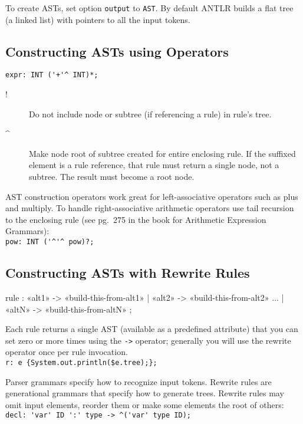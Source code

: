 To create ASTs, set option \verb=output= to \verb=AST=.
By default ANTLR builds a flat tree (a linked list)
with pointers to all the input tokens.


\subsection{Constructing ASTs using Operators}

\verb=expr: INT ('+'^ INT)*;=

\begin{description}
\item[!]
Do not include node or subtree (if referencing a rule) in rule's tree.
\item[\textasciicircum]
Make node root of subtree created for entire enclosing rule.
If the suffixed element is a rule reference,
that rule must return a single node, not a subtree.
The result must become a root node.
\end{description}

AST construction operators work great for left-associative operators
such as plus and multiply.
To handle right-associative arithmetic operators
use tail recursion to the enclosing rule
(see pg.\ 275 in the book for Arithmetic Expression Grammars):\\
\verb=pow: INT ('^'^ pow)?;=


\subsection{Constructing ASTs with Rewrite Rules}

\begin{verbatimtab}
rule	: «alt1» -> «build-this-from-alt1»
	| «alt2» -> «build-this-from-alt2»
	...
	| «altN» -> «build-this-from-altN»
	;
\end{verbatimtab}

Each rule returns a single AST (available as a predefined attribute)
that you can set zero or more times using the \verb=->= operator;
generally you will use the rewrite operator once per rule invocation.\\
\verb=r: e {System.out.println($e.tree);};=

Parser grammars specify how to recognize input tokens.
Rewrite rules are generational grammars that specify how to generate trees.
Rewrite rules may omit input elements, reorder them
or make some elements the root of others:\\
\verb=decl: 'var' ID ':' type -> ^('var' type ID);=

